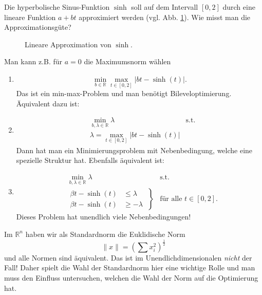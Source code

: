 \documentclass[main.tex]{subfiles}
\begin{document}
\begin{bsp}\label{1.4}
Die hyperbolische Sinus-Funktion $\sinh$ soll auf dem Intervall $[0,2]$ durch eine lineare Funktion $a+bt$ approximiert werden (vgl. Abb. \ref{fig:1.4}). Wie misst man die Approximationsgüte?\\
\begin{figure}[h!]\label{fig:1.4}
    \centering
    
    \caption{Lineare Approximation von $\sinh$.}
\end{figure}
Man kann z.B. für $a=0$ die Maximumsnorm wählen
\begin{enumerate}[label=\alph*)]
    \item $$\min_{ b\in ℝ}\max_{t\in [0,2]} | bt - \sinh(t) |.$$
    Das ist ein min-max-Problem und man benötigt Bileveloptimierung.
    Äquivalent dazu ist:
    \item \begin{align*}
        &\min_{b, λ\in ℝ} λ&\text{s.t.}\\
        &λ = \max_{t\in [0,2]} |bt - \sinh(t) |
        \end{align*}
    Dann hat man ein Minimierungsproblem mit Nebenbedingung, welche eine spezielle Struktur hat. Ebenfalls äquivalent ist:
    \item 
    \begin{align*}
        &\min_{b,λ\in ℝ}λ&\text{s.t.}\\
        &\left. \begin{aligned}
        βt - \sinh (t) &\le λ \\
        βt - \sinh(t) &\ge -λ
        \end{aligned}\; \right\} &\text{für alle $t \in [0,2]$}. 
    \end{align*}
    Dieses Problem hat unendlich viele Nebenbedingungen!
\end{enumerate}
\end{bsp}

\begin{bem*}
Im $ℝ^n$ haben wir als Standardnorm die Euklidische Norm
$$\|x\| = \left( \sum x_i^2 \right)^{\frac{1}{2}}$$
und alle Normen sind äquivalent. Das ist im Unendlichdimensionalen \emph{nicht} der Fall! Daher spielt die Wahl der Standardnorm hier eine wichtige Rolle und man muss den Einfluss untersuchen, welchen die Wahl der Norm auf die Optimierung hat.
\end{bem*}
\end{document}
